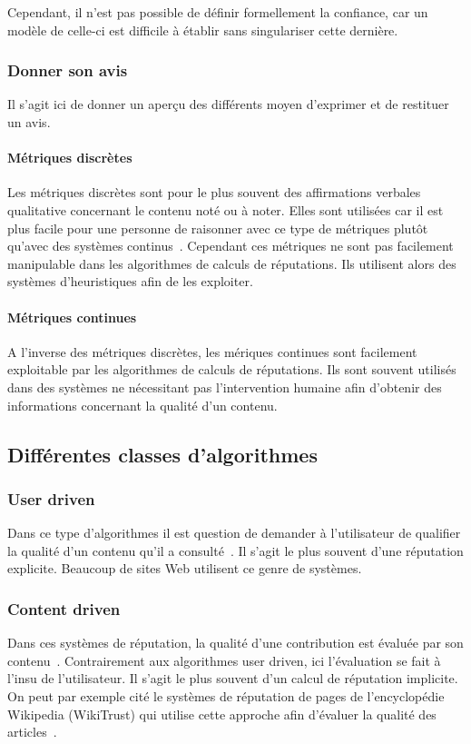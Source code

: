 \documentclass[a4paper, 11pt]{article} %
\begin{document}
Cependant, il n'est pas possible de définir formellement la confiance, car un modèle de celle-ci est difficile à établir sans singulariser cette dernière.

\subsubsection{Donner son avis}
Il s'agit ici de donner un aperçu des différents moyen d'exprimer et de restituer un avis.

\paragraph{Métriques discrètes}
Les métriques discrètes sont pour le plus souvent des affirmations verbales qualitative concernant le contenu noté ou à noter.
Elles sont utilisées car il est plus facile pour une personne de raisonner avec ce type de métriques plutôt qu'avec des systèmes continus~\cite{JosangIsmailBoyd2007}.
Cependant ces métriques ne sont pas facilement manipulable dans les algorithmes de calculs de réputations.
Ils utilisent alors des systèmes d'heuristiques afin de les exploiter.

\paragraph{Métriques continues}
A l'inverse des métriques discrètes, les mériques continues sont facilement exploitable par les algorithmes de calculs de réputations.
Ils sont souvent utilisés dans des systèmes ne nécessitant pas l'intervention humaine afin d'obtenir des informations concernant la qualité d'un contenu.

\subsection{Différentes classes d'algorithmes}
\subsubsection{User driven}
Dans ce type d'algorithmes il est question de demander à l'utilisateur de qualifier la qualité d'un contenu qu'il a consulté~\cite{Tulungan2013}.
Il s'agit le plus souvent d'une réputation explicite.
Beaucoup de sites Web utilisent ce genre de systèmes.

\subsubsection{Content driven}
Dans ces systèmes de réputation, la qualité d'une contribution est évaluée par son contenu~\cite{Tulungan2013}.
Contrairement aux algorithmes user driven, ici l'évaluation se fait à l'insu de l'utilisateur.
Il s'agit le plus souvent d'un calcul de réputation implicite.
On peut par exemple cité le systèmes de réputation de pages de l'encyclopédie Wikipedia (WikiTrust) qui utilise cette approche afin d'évaluer la qualité des articles~\cite{WikiTrustSite}.
\end{document}
